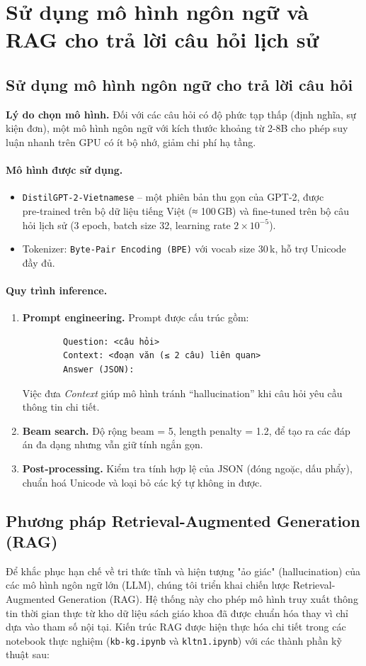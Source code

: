 \section{Sử dụng mô hình ngôn ngữ và RAG cho trả lời câu hỏi lịch sử}
\label{sec:llm_and_rag}
\subsection{Sử dụng mô hình ngôn ngữ cho trả lời câu hỏi}
\label{subsec:small_llm}
\textbf{Lý do chọn mô hình.} Đối với các câu hỏi có độ phức tạp thấp (định nghĩa, sự kiện đơn), một mô hình ngôn ngữ với kích thước khoảng từ 2-8B cho phép suy luận nhanh trên GPU có ít bộ nhớ, giảm chi phí hạ tầng.  
\paragraph{Mô hình được sử dụng.}
\begin{itemize}
  \item \texttt{DistilGPT‑2‑Vietnamese} – một phiên bản thu gọn của GPT‑2, được pre‑trained trên bộ dữ liệu tiếng Việt (≈ 100 GB) và fine‑tuned trên bộ câu hỏi lịch sử (3 epoch, batch size 32, learning rate $2\times10^{-5}$).  
  \item Tokenizer: \texttt{Byte‑Pair Encoding (BPE)} với vocab size 30 k, hỗ trợ Unicode đầy đủ.
\end{itemize}
\paragraph{Quy trình inference.}
\begin{enumerate}
  \item \textbf{Prompt engineering.} Prompt được cấu trúc gồm:  
        \begin{verbatim}
        Question: <câu hỏi>
        Context: <đoạn văn (≤ 2 câu) liên quan>
        Answer (JSON):
        \end{verbatim}
        Việc đưa \textit{Context} giúp mô hình tránh “hallucination” khi câu hỏi yêu cầu thông tin chi tiết.
  \item \textbf{Beam search.} Độ rộng beam = 5, length penalty = 1.2, để tạo ra các đáp án đa dạng nhưng vẫn giữ tính ngắn gọn.
  \item \textbf{Post‑processing.} Kiểm tra tính hợp lệ của JSON (đóng ngoặc, dấu phẩy), chuẩn hoá Unicode và loại bỏ các ký tự không in được.
\end{enumerate}
\subsection{Phương pháp Retrieval-Augmented Generation (RAG)}
\label{subsec:rag_implementation}
Để khắc phục hạn chế về tri thức tĩnh và hiện tượng "ảo giác" (hallucination) của các mô hình ngôn ngữ lớn (LLM), chúng tôi triển khai chiến lược Retrieval-Augmented Generation (RAG). Hệ thống này cho phép mô hình truy xuất thông tin thời gian thực từ kho dữ liệu sách giáo khoa đã được chuẩn hóa thay vì chỉ dựa vào tham số nội tại. 
Kiến trúc RAG được hiện thực hóa chi tiết trong các notebook thực nghiệm (\texttt{kb-kg.ipynb} và \texttt{kltn1.ipynb}) với các thành phần kỹ thuật sau:
